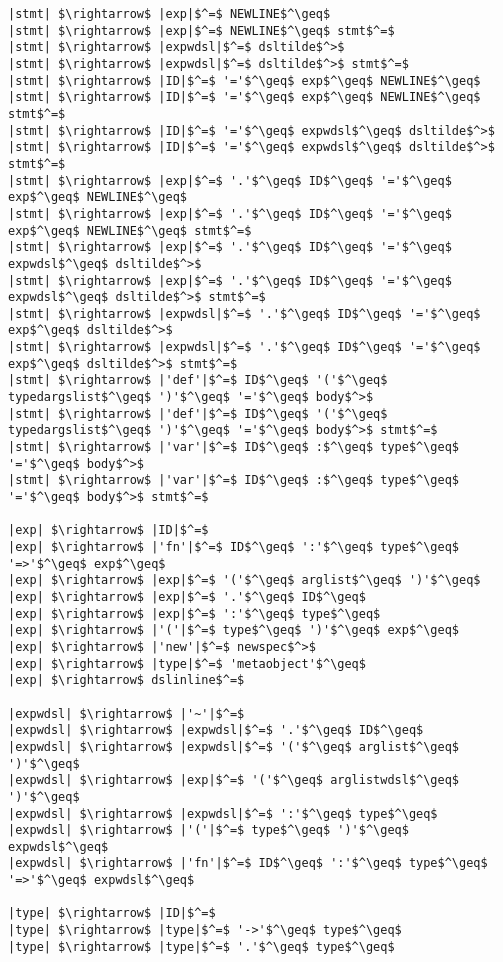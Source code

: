 \begin{lstlisting}[mathescape]
|stmt| $\rightarrow$ |exp|$^=$ NEWLINE$^\geq$
|stmt| $\rightarrow$ |exp|$^=$ NEWLINE$^\geq$ stmt$^=$
|stmt| $\rightarrow$ |expwdsl|$^=$ dsltilde$^>$
|stmt| $\rightarrow$ |expwdsl|$^=$ dsltilde$^>$ stmt$^=$
|stmt| $\rightarrow$ |ID|$^=$ '='$^\geq$ exp$^\geq$ NEWLINE$^\geq$
|stmt| $\rightarrow$ |ID|$^=$ '='$^\geq$ exp$^\geq$ NEWLINE$^\geq$ stmt$^=$
|stmt| $\rightarrow$ |ID|$^=$ '='$^\geq$ expwdsl$^\geq$ dsltilde$^>$
|stmt| $\rightarrow$ |ID|$^=$ '='$^\geq$ expwdsl$^\geq$ dsltilde$^>$ stmt$^=$
|stmt| $\rightarrow$ |exp|$^=$ '.'$^\geq$ ID$^\geq$ '='$^\geq$ exp$^\geq$ NEWLINE$^\geq$
|stmt| $\rightarrow$ |exp|$^=$ '.'$^\geq$ ID$^\geq$ '='$^\geq$ exp$^\geq$ NEWLINE$^\geq$ stmt$^=$
|stmt| $\rightarrow$ |exp|$^=$ '.'$^\geq$ ID$^\geq$ '='$^\geq$ expwdsl$^\geq$ dsltilde$^>$
|stmt| $\rightarrow$ |exp|$^=$ '.'$^\geq$ ID$^\geq$ '='$^\geq$ expwdsl$^\geq$ dsltilde$^>$ stmt$^=$
|stmt| $\rightarrow$ |expwdsl|$^=$ '.'$^\geq$ ID$^\geq$ '='$^\geq$ exp$^\geq$ dsltilde$^>$
|stmt| $\rightarrow$ |expwdsl|$^=$ '.'$^\geq$ ID$^\geq$ '='$^\geq$ exp$^\geq$ dsltilde$^>$ stmt$^=$
|stmt| $\rightarrow$ |'def'|$^=$ ID$^\geq$ '('$^\geq$ typedargslist$^\geq$ ')'$^\geq$ '='$^\geq$ body$^>$
|stmt| $\rightarrow$ |'def'|$^=$ ID$^\geq$ '('$^\geq$ typedargslist$^\geq$ ')'$^\geq$ '='$^\geq$ body$^>$ stmt$^=$
|stmt| $\rightarrow$ |'var'|$^=$ ID$^\geq$ :$^\geq$ type$^\geq$ '='$^\geq$ body$^>$
|stmt| $\rightarrow$ |'var'|$^=$ ID$^\geq$ :$^\geq$ type$^\geq$ '='$^\geq$ body$^>$ stmt$^=$

|exp| $\rightarrow$ |ID|$^=$
|exp| $\rightarrow$ |'fn'|$^=$ ID$^\geq$ ':'$^\geq$ type$^\geq$ '=>'$^\geq$ exp$^\geq$
|exp| $\rightarrow$ |exp|$^=$ '('$^\geq$ arglist$^\geq$ ')'$^\geq$
|exp| $\rightarrow$ |exp|$^=$ '.'$^\geq$ ID$^\geq$
|exp| $\rightarrow$ |exp|$^=$ ':'$^\geq$ type$^\geq$
|exp| $\rightarrow$ |'('|$^=$ type$^\geq$ ')'$^\geq$ exp$^\geq$
|exp| $\rightarrow$ |'new'|$^=$ newspec$^>$
|exp| $\rightarrow$ |type|$^=$ 'metaobject'$^\geq$
|exp| $\rightarrow$ dslinline$^=$

|expwdsl| $\rightarrow$ |'~'|$^=$
|expwdsl| $\rightarrow$ |expwdsl|$^=$ '.'$^\geq$ ID$^\geq$
|expwdsl| $\rightarrow$ |expwdsl|$^=$ '('$^\geq$ arglist$^\geq$ ')'$^\geq$
|expwdsl| $\rightarrow$ |exp|$^=$ '('$^\geq$ arglistwdsl$^\geq$ ')'$^\geq$
|expwdsl| $\rightarrow$ |expwdsl|$^=$ ':'$^\geq$ type$^\geq$
|expwdsl| $\rightarrow$ |'('|$^=$ type$^\geq$ ')'$^\geq$ expwdsl$^\geq$
|expwdsl| $\rightarrow$ |'fn'|$^=$ ID$^\geq$ ':'$^\geq$ type$^\geq$ '=>'$^\geq$ expwdsl$^\geq$
        
|type| $\rightarrow$ |ID|$^=$
|type| $\rightarrow$ |type|$^=$ '->'$^\geq$ type$^\geq$
|type| $\rightarrow$ |type|$^=$ '.'$^\geq$ type$^\geq$


\end{lstlisting}
